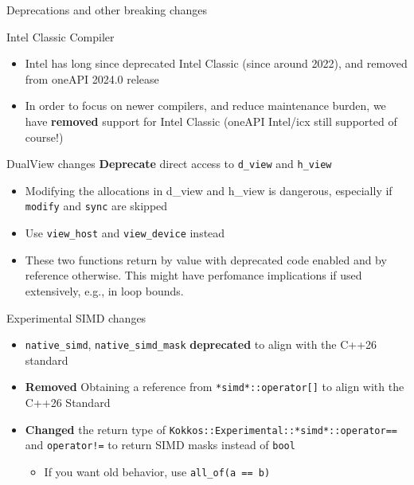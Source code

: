 
\begin{frame}[fragile]

  {\Huge Deprecations and other breaking changes}

  \vspace{10pt}

\end{frame}


\begin{frame}[fragile]{Intel Classic Compiler}
  \begin{itemize}
    \item Intel has long since deprecated Intel Classic (since around 2022), and removed from oneAPI 2024.0 release
    \item In order to focus on newer compilers, and reduce maintenance burden, we have \textbf{removed} support for Intel Classic (oneAPI Intel/icx still supported of course!)
  \end{itemize}
\end{frame}


\begin{frame}[fragile]{DualView changes}
  \textbf{Deprecate} direct access to \texttt{d\_view} and \texttt{h\_view}
  \begin{itemize}
    \item Modifying the allocations in d\_view and h\_view is dangerous, especially if \texttt{modify} and \texttt{sync} are skipped
    \item Use \texttt{view\_host} and \texttt{view\_device} instead
    \item These two functions return by value with deprecated code enabled and by reference otherwise. This might have perfomance implications if used extensively, e.g., in loop bounds.
  \end{itemize}
\end{frame}


\begin{frame}[fragile]{Experimental SIMD changes}
  \begin{itemize}
    \item \texttt{native\_simd}, \texttt{native\_simd\_mask} \textbf{deprecated} to align with the C++26 standard
    \item \textbf{Removed} Obtaining a reference from \texttt{*simd*::operator[]} to align with the C++26 Standard
    \item \textbf{Changed} the return type of \texttt{Kokkos::Experimental::*simd*::operator==} and \texttt{operator!=} to return SIMD masks instead of \texttt{bool}
    \begin{itemize}
      \item If you want old behavior, use \texttt{all\_of(a == b)}
    \end{itemize}
  \end{itemize}
\end{frame}


